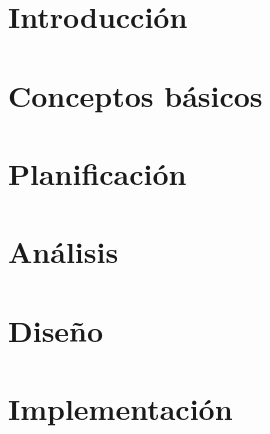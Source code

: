 \documentclass[a4paper,11pt,spanish]{book}
\begin{document}
\renewcommand{\figurename}{Figura}
\renewcommand{\listfigurename}{Índice de figuras}
\renewcommand{\lstlistingname}{Listado}
\renewcommand*\lstlistlistingname{Índice de listados}

\pagestyle{empty}

\cleardoublepage


\cleardoublepage
\pagestyle{plain}

\frontmatter %


\cleardoublepage

\tableofcontents
\listoffigures
\listoftables
\lstlistoflistings


\mainmatter %


\chapter{Introducción}


\chapter{Conceptos básicos}


\chapter{Planificación}


\chapter{Análisis}


\chapter{Diseño}


\chapter{Implementación}

\end{document}
